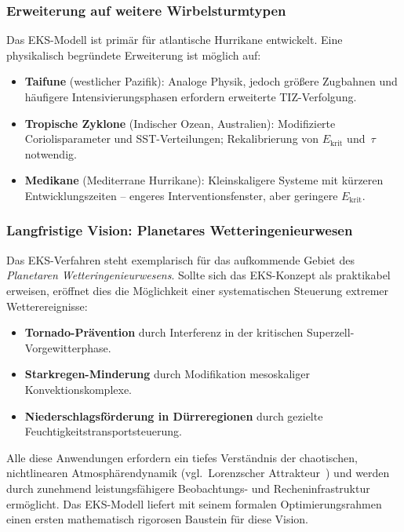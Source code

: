 ﻿\documentclass[a4paper,12pt]{article}
\theoremstyle{definition}
\begin{document}
\subsubsection{Erweiterung auf weitere Wirbelsturmtypen}

Das EKS-Modell ist prim\"{a}r f\"{u}r atlantische Hurrikane entwickelt.
Eine physikalisch begr\"{u}ndete Erweiterung ist m\"{o}glich auf:
\begin{itemize}
    \item \textbf{Taifune} (westlicher Pazifik): Analoge Physik,
          jedoch gr\"{o}\ss{}ere Zugbahnen und h\"{a}ufigere
          Intensivierungsphasen erfordern erweiterte TIZ-Verfolgung.
    \item \textbf{Tropische Zyklone} (Indischer Ozean, Australien):
          Modifizierte Coriolisparameter und SST-Verteilungen;
          Rekalibrierung von $E_{\mathrm{krit}}$ und~$\tau$ notwendig.
    \item \textbf{Medikane} (Mediterrane Hurrikane): Kleinskaligere Systeme
          mit k\"{u}rzeren Entwicklungszeiten -- engeres Interventionsfenster,
          aber geringere $E_{\mathrm{krit}}$.
\end{itemize}

\subsubsection{Langfristige Vision: Planetares Wetteringenieurwesen}

Das EKS-Verfahren steht exemplarisch f\"{u}r das aufkommende Gebiet
des \emph{Planetaren Wetteringenieurwesens}.
Sollte sich das EKS-Konzept als praktikabel erweisen, er\"{o}ffnet
dies die M\"{o}glichkeit einer systematischen Steuerung extremer
Wetterereignisse:
\begin{itemize}
    \item \textbf{Tornado-Pr\"{a}vention} durch Interferenz in der
          kritischen Superzell-Vorgewitterphase.
    \item \textbf{Starkregen-Minderung} durch Modifikation mesoskaliger
          Konvektionskomplexe.
    \item \textbf{Niederschlagsf\"{o}rderung in D\"{u}rreregionen}
          durch gezielte Feuchtigkeitstransportsteuerung.
\end{itemize}

Alle diese Anwendungen erfordern ein tiefes Verst\"{a}ndnis der chaotischen,
nichtlinearen Atmosph\"{a}rendynamik (vgl.\ Lorenzscher Attrakteur~\cite{lorenz1963})
und werden durch zunehmend leistungsf\"{a}higere Beobachtungs- und
Recheninfrastruktur erm\"{o}glicht.
Das EKS-Modell liefert mit seinem formalen Optimierungsrahmen einen
ersten mathematisch rigorosen Baustein f\"{u}r diese Vision.
\end{document}
